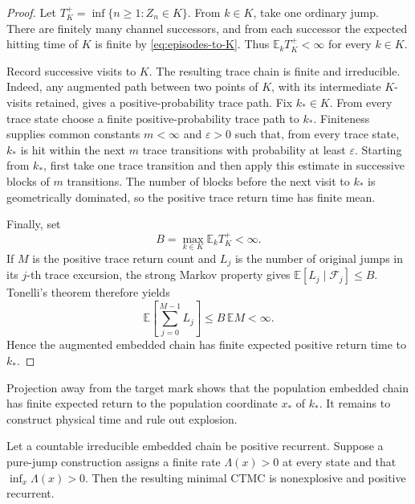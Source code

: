 \begin{proof}
Let \(T_K^+=\inf\{n\ge1:Z_n\in K\}\).  From \(k\in K\), take one ordinary
jump.  There are finitely many channel successors, and from each successor
the expected hitting time of \(K\) is finite by \eqref{eq:episodes-to-K}.
Thus \(\mathbb E_kT_K^+<\infty\) for every \(k\in K\).

Record successive visits to \(K\).  The resulting trace chain is finite and
irreducible.  Indeed, any augmented path between two points of \(K\), with
its intermediate \(K\)-visits retained, gives a positive-probability trace
path.  Fix \(k_*\in K\).  From every trace state choose a finite
positive-probability trace path to \(k_*\).  Finiteness supplies common
constants \(m<\infty\) and \(\varepsilon>0\) such that, from every trace
state, \(k_*\) is hit within the next \(m\) trace transitions with probability
at least \(\varepsilon\).  Starting from \(k_*\), first take one trace
transition and then apply this estimate in successive blocks of \(m\)
transitions.  The number of blocks before the next visit to \(k_*\) is
geometrically dominated, so the positive trace return time has finite mean.

Finally, set
\[
  B=\max_{k\in K}\mathbb E_kT_K^+<\infty.
\]
If \(M\) is the positive trace return count and \(L_j\) is the number of
original jumps in its \(j\)-th trace excursion, the strong Markov property
gives \(\mathbb E[L_j\mid\mathcal F_j]\le B\).  Tonelli's theorem therefore
yields
\[
  \mathbb E\!\left[\sum_{j=0}^{M-1}L_j\right]
  \le B\,\mathbb E M<\infty.
\]
Hence the augmented embedded chain has finite expected positive return time
to \(k_*\).
\end{proof}

Projection away from the target mark shows that the population embedded chain
has finite expected return to the population coordinate \(x_*\) of \(k_*\).
It remains to construct physical time and rule out explosion.

\begin{proposition}\label{prop:ctmc}
Let a countable irreducible embedded chain be positive recurrent.  Suppose a
pure-jump construction assigns a finite rate \(\Lambda(x)>0\) at every state
and that \(\inf_x\Lambda(x)>0\).  Then the resulting minimal CTMC is
nonexplosive and positive recurrent.
\end{proposition}

